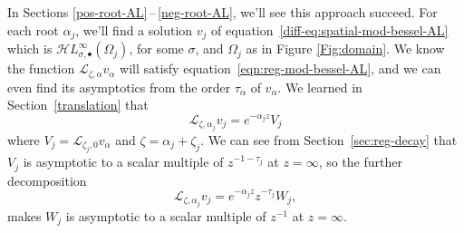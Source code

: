 \documentclass{article}
\newcommand{\singexp}[2]{\mathcal{H}L^\infty_{#1, #2}}
\newcommand{\singexpalg}[1]{\singexp{#1}{\bullet}}
\newcommand{\fracderiv}[3]{\partial^{#1}_{#2, #3}}
\newcommand{\laplace}{\mathcal{L}}
\theoremstyle{definition}
\theoremstyle{plain}
\begin{document}
{In Sections \ref{pos-root-AL}\,--\,\ref{neg-root-AL}, we'll see this approach succeed. For each root $\alpha_j$, we'll find a solution $v_j$ of equation~\eqref{diff-eq:spatial-mod-bessel-AL} which is $\singexpalg{\sigma}(\Omega_j)$, for some $\sigma$, and $\Omega_j$ as in Figure \ref{Fig:domain}. We know the function $\laplace_{\zeta, \alpha} v_\alpha$ will satisfy equation~\eqref{eqn:reg-mod-bessel-AL}, and we can even find its asymptotics from the order $\tau_\alpha$ of $v_\alpha$. We learned in Section~\ref{translation} that
\[ \laplace_{\zeta, \alpha_j} v_j = e^{-\alpha_j z} V_j \]
where $V_j = \laplace_{\zeta_j, 0} v_\alpha$ and $\zeta = \alpha_j + \zeta_j$. We can see from Section~\ref{sec:reg-decay} that $V_j$ is asymptotic to a scalar multiple of $z^{-1 - \tau_j}$ at $z = \infty$, so the further decomposition
\[ \laplace_{\zeta, \alpha_j} v_j = e^{-\alpha_j z} z^{-\tau_j} W_j, \]
makes $W_j$ is asymptotic to a scalar multiple of $z^{-1}$ at $z = \infty$.
}
\end{document}
